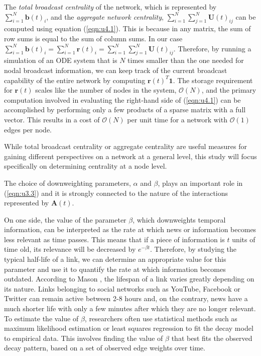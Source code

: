 The \textit{total broadcast centrality} of the network, which is represented by $\sum_{i=1}^{N} \mathbf{b}(t)_i$, and the \textit{aggregate network centrality}, $\sum_{i=1}^{N}\sum_{j=1}^{N} \mathbf{U}(t)_{ij}$ can be computed using equation (\ref{eqn:u4.1}). This is because in any matrix, the sum of row sums is equal to the sum of column sums. In our case $\sum_{i=1}^{N} \mathbf{b}(t)_i = \sum_{i=1}^{N} \mathbf{r}(t)_i=\sum_{i=1}^{N}\sum_{j=1}^{N} \mathbf{U}(t)_{ij}$. Therefore, by running a simulation of an ODE system that is $N$ times smaller than the one needed for nodal broadcast information, we can keep track of the current broadcast capability of the entire network by computing $\mathbf{r}(t)^T\mathbf{1}$. The storage requirement for $\mathbf{r}(t)$ scales like the number of nodes in the system, $\mathcal{O}(N)$, and the primary computation involved in evaluating the right-hand side of (\ref{eqn:u4.1}) can be accomplished by performing only a few products of a sparse matrix with a full vector. This results in a cost of $\mathcal{O}(N)$ per unit time for a network with $\mathcal{O}(1)$ edges per node.

While total broadcast centrality or aggregate centrality are useful measures for gaining different perspectives on a network at a general level, this study will focus specifically on determining centrality at a node level.

\begin{highlightedParagraphC}
 
The choice of downweighting parameters, $\alpha$ and $\beta$, plays an important role in (\ref{eqn:u3.3}) and it is strongly connected to the nature of the interactions represented by $\mathbf{A}(t)$.

\end{highlightedParagraphC}

On one side, the value of the parameter $\beta$, which downweights temporal information, can be interpreted as the rate at which news or information becomes less relevant as time passes. This means that if a piece of information is $t$ units of time old, its relevance will be decreased by $e^{−\beta t}$. Therefore, by studying the typical half-life of a link, we can determine an appropriate value for this parameter and use it to quantify the rate at which information becomes outdated. According to Mason \cite{lifespan}, the lifespan of a link varies greatly depending on its nature. Links belonging to social networks such as YouTube, Facebook or Twitter can remain active between 2-8 hours and, on the contrary, news have a much shorter life with only a few minutes after which they are no longer relevant. To estimate the value of $\beta$, researchers often use statistical methods such as maximum likelihood estimation or least squares regression to fit the decay model to empirical data. This involves finding the value of $\beta$ that best fits the observed decay pattern, based on a set of observed edge weights over time.

